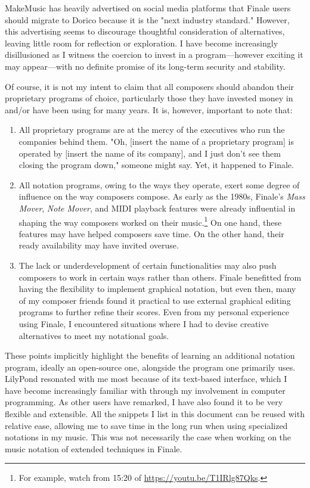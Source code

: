 \documentclass[11pt, oneside]{book}   	%
\begin{document}
MakeMusic has heavily advertised on social media platforms that Finale users should migrate to Dorico because it is the "next industry standard." However, this advertising seems to discourage thoughtful consideration of alternatives, leaving little room for reflection or exploration. I have become increasingly disillusioned as I witness the coercion to invest in a program—however exciting it may appear—with no definite promise of its long-term security and stability.

Of course, it is not my intent to claim that all composers should abandon their proprietary programs of choice, particularly those they have invested money in and/or have been using for many years. It is, however, important to note that: 

\begin{enumerate}

\item All proprietary programs are at the mercy of the executives who run the companies behind them. "Oh, [insert the name of a proprietary program] is operated by [insert the name of its company], and I just don't see them closing the program down," someone might say. Yet, it happened to Finale. 

\item All notation programs, owing to the ways they operate, exert some degree of influence on the way composers compose. As early as the 1980s, Finale's \textit{Mass Mover}, \textit{Note Mover}, and MIDI playback features were already influential in shaping the way composers worked on their music.\footnote{For example, watch from 15:20 of \url{https://youtu.be/T1IRlg87Qks}.} On one hand, these features may have helped composers save time. On the other hand, their ready availability may have invited overuse. 

\item The lack or underdevelopment of certain functionalities may also push composers to work in certain ways rather than others. Finale benefitted from having the flexibility to implement graphical notation, but even then, many of my composer friends found it practical to use external graphical editing programs to further refine their scores. Even from my personal experience using Finale, I encountered situations where I had to devise creative alternatives to meet my notational goals. 
\end{enumerate}

These points implicitly highlight the benefits of learning an additional notation program, ideally an open-source one, alongside the program one primarily uses. LilyPond resonated with me most because of its text-based interface, which I have become increasingly familiar with through my involvement in computer programming. As other users have remarked, I have also found it to be very flexible and extensible. All the snippets I list in this document can be reused with relative ease, allowing me to save time in the long run when using specialized notations in my music. This was not necessarily the case when working on the music notation of extended techniques in Finale.
\end{document}
